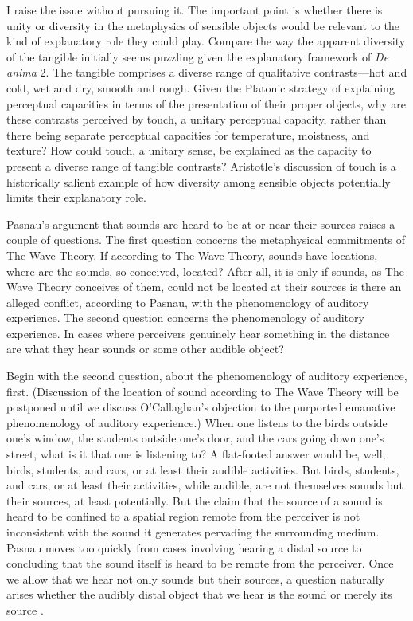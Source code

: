 I raise the issue without pursuing it. The important point is whether there is unity or diversity in the metaphysics of sensible objects would be relevant to the kind of explanatory role they could play. Compare the way the apparent diversity of the tangible initially seems puzzling given the explanatory framework of \emph{De anima} 2. The tangible comprises a diverse range of qualitative contrasts---hot and cold, wet and dry, smooth and rough. Given the Platonic strategy of explaining perceptual capacities in terms of the presentation of their proper objects, why are these contrasts perceived by touch, a unitary perceptual capacity, rather than there being separate perceptual capacities for temperature, moistness, and texture? How could touch, a unitary sense, be explained as the capacity to present a diverse range of tangible contrasts? Aristotle's discussion of touch is a historically salient example of how diversity among sensible objects potentially limits their explanatory role.

Pasnau's argument that sounds are heard to be at or near their sources raises a couple of questions. The first question concerns the metaphysical commitments of The Wave Theory. If according to The Wave Theory, sounds have locations, where are the sounds, so conceived, located? After all, it is only if sounds, as The Wave Theory conceives of them, could not be located at their sources is there an alleged conflict, according to Pasnau, with the phenomenology of auditory experience.  The second question concerns the phenomenology of auditory experience. In cases where perceivers genuinely hear something in the distance are what they hear sounds or some other audible object? 

Begin with the second question, about the phenomenology of auditory experience, first. (Discussion of the location of sound according to The Wave Theory will be postponed until we discuss O'Callaghan's \citeyear{OCallaghan:2007xy,OCallaghan:2009aa} objection to the purported emanative phenomenology of auditory experience.) When one listens to the birds outside one's window, the students outside one's door, and the cars going down one's street, what is it that one is listening to? A flat-footed answer would be, well, birds, students, and cars, or at least their audible activities. But birds, students, and cars, or at least their activities, while audible, are not themselves sounds but their sources, at least potentially. But the claim that the source of a sound is heard to be confined to a spatial region remote from the perceiver is not inconsistent with the sound it generates pervading the surrounding medium. Pasnau moves too quickly from cases involving hearing a distal source to concluding that the sound itself is heard to be remote from the perceiver. Once we allow that we hear not only sounds but their sources, a question naturally arises whether the audibly distal object that we hear is the sound or merely its source \citep[see][123, for a development of this worry]{OShaughnessy:2009aa}.


